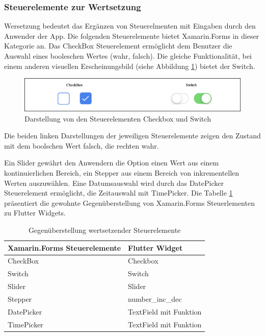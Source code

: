 

\subsubsection{Steuerelemente zur Wertsetzung}
Wersetzung bedeutet das Ergänzen von Steuerelmenten mit Eingaben durch den Anwender der App.  Die folgenden Steuerelemente bietet Xamarin.Forms in dieser Kategorie an.  Das \glq CheckBox\grq{}  Steuerelement ermöglicht dem Benutzer die Auswahl eines boole­schen Wertes (wahr, falsch).  Die gleiche Funktionalität, bei einem anderen visuellen Erscheinungsbild (siehe Abbildung  \ref{fig:SwitchCheckbox}) bietet der \glq Switch\grq{}.  

\begin{figure}[!ht]
 \includegraphics[width=\textwidth,height=\textheight,keepaspectratio]{Images/CrossPlattformFrameworks/SwitchTextBox.png}
 \caption{Darstellung von den Steuerelementen \glq Checkbox\grq{} und \glq Switch\grq}
 \label{fig:SwitchCheckbox}
\end{figure}
Die beiden linken Darstellungen der jeweiligen Steuerelemente zeigen den Zustand mit dem boolschen Wert falsch,  die rechten wahr.

Ein  \glq Slider\grq{}  gewährt den Anwendern die Option einen Wert aus einem kontinuierlichen Bereich,  ein \glq Stepper\grq{}  aus einem Bereich von inkrementellen Werten auszuwählen.  Eine Datumsauswahl wird durch das \glq DatePicker\grq{} Steuerelement ermöglicht,  die Zeitauswahl mit \glq TimePicker\grq{}.  Die Tabelle \ref{tab:valuecontrols} präsentiert die gewohnte Gegenüberstellung von Xamarin.Forms Steuerlementen zu Flutter Widgets. 

\begin{table}[!ht]
\begin{tabularx}{\textwidth}{X|X}
   \textbf{Xamarin.Forms Steuerelemente} & \textbf{Flutter Widget}  \\
\hline
	CheckBox		       				&  Checkbox	 		\\ 
	Switch		       					&  Switch	 		\\ 
	Slider		       					&  Slider	 		\\ 
	Stepper		       				&  number\_inc\_dec	 		\\ 
	DatePicker		       			&  TextField mit Funktion		\\ 
	TimePicker		       			&  TextField mit Funktion	 		\\ 
\end{tabularx}
\caption{Gegenüberstellung wertsetzender Steuerelemente}
 \label{tab:valuecontrols}
\end{table}
 
